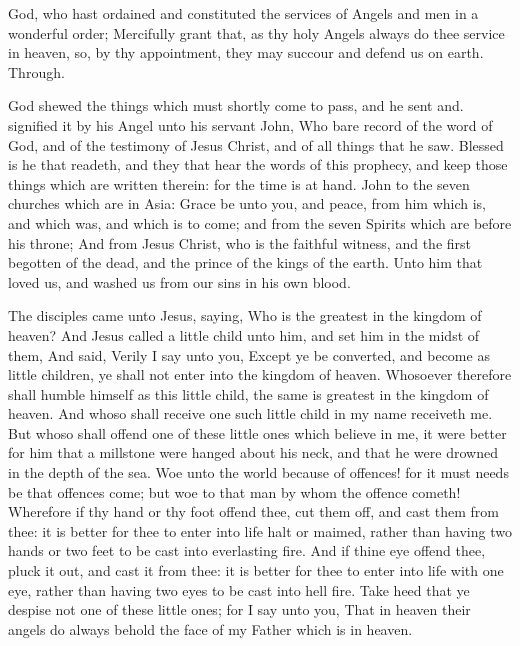 \collect
{} God, who hast ordained and constituted the services of Angels and men in a wonderful order; Mercifully grant that, as thy holy Angels always do thee service in heaven, so, by thy appointment, they may succour and defend us on earth. Through.

 God shewed the things which must shortly come to pass, and he sent and. signified it by his Angel unto his servant John, Who bare record of the word of God, and of the testimony of Jesus Christ, and of all things that he saw. Blessed is he that readeth, and they that hear the words of this prophecy, and keep those things which are written therein: for the time is at hand. John to the seven churches which are in Asia: Grace be unto you, and peace, from him which is, and which was, and which is to come; and from the seven Spirits which are before his throne; And from Jesus Christ, who is the faithful witness, and the first begotten of the dead, and the prince of the kings of the earth. Unto him that loved us, and washed us from our sins in his own blood.


 The disciples came unto Jesus, saying, Who is the greatest in the kingdom of heaven? And Jesus called a little child unto him, and set him in the midst of them, And said, Verily I say unto you, Except ye be converted, and become as little children, ye shall not enter into the kingdom of heaven. Whosoever therefore shall humble himself as this little child, the same is greatest in the kingdom of heaven. And whoso shall receive one such little child in my name receiveth me. But whoso shall offend one of these little ones which believe in me, it were better for him that a millstone were hanged about his neck, and that he were drowned in the depth of the sea. Woe unto the world because of offences! for it must needs be that offences come; but woe to that man by whom the offence cometh! Wherefore if thy hand or thy foot offend thee, cut them off, and cast them from thee: it is better for thee to enter into life halt or maimed, rather than having two hands or two feet to be cast into everlasting fire. And if thine eye offend thee, pluck it out, and cast it from thee: it is better for thee to enter into life with one eye, rather than having two eyes to be cast into hell fire. Take heed that ye despise not one of these little ones; for I say unto you, That in heaven their angels do always behold the face of my Father which is in heaven.

